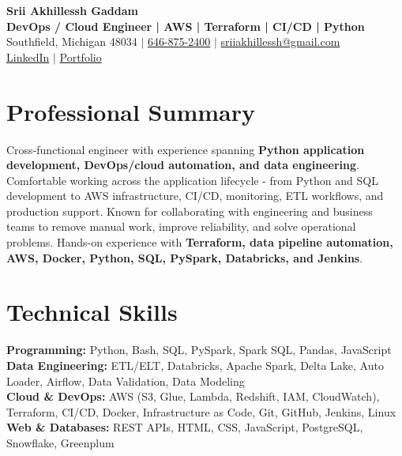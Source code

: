 \documentclass[letterpaper,10pt]{article}
\begin{document}
\fontsize{9.35pt}{10.45pt}\selectfont

\begin{center}
    {\LARGE \textbf{Srii Akhillessh Gaddam}} \\[-1pt]
    \textbf{DevOps / Cloud Engineer | AWS | Terraform | CI/CD | Python} \\[2pt]
    Southfield, Michigan 48034 $|$
    \href{tel:6468752400}{646-875-2400} $|$
    \href{mailto:sriiakhillessh@gmail.com}{sriiakhillessh@gmail.com} \\[1pt]
    \href{https://www.linkedin.com/in/srii-akhiilessh-gaddam-b48668191/}{LinkedIn} $|$
    \href{https://sriiakhillesshg.github.io/portfolio/}{Portfolio}
\end{center}
\vspace{-8pt}

\section{Professional Summary}
\small{Cross-functional engineer with experience spanning \textbf{Python application development, DevOps/cloud automation, and data engineering}. Comfortable working across the application lifecycle - from Python and SQL development to AWS infrastructure, CI/CD, monitoring, ETL workflows, and production support. Known for collaborating with engineering and business teams to remove manual work, improve reliability, and solve operational problems. Hands-on experience with \textbf{Terraform, data pipeline automation, AWS, Docker, Python, SQL, PySpark, Databricks, and Jenkins}.}

\section{Technical Skills}
\small{
\textbf{Programming:} Python, Bash, SQL, PySpark, Spark SQL, Pandas, JavaScript \\
\textbf{Data Engineering:} ETL/ELT, Databricks, Apache Spark, Delta Lake, Auto Loader, Airflow, Data Validation, Data Modeling \\
\textbf{Cloud \& DevOps:} AWS (S3, Glue, Lambda, Redshift, IAM, CloudWatch), Terraform, CI/CD, Docker, Infrastructure as Code, Git, GitHub, Jenkins, Linux \\
\textbf{Web \& Databases:} REST APIs, HTML, CSS, JavaScript, PostgreSQL, Snowflake, Greenplum
}
\end{document}
